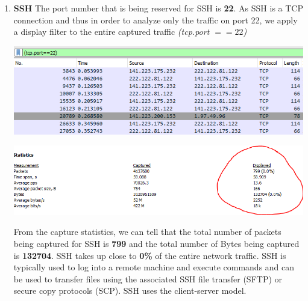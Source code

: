 \documentclass[a4paper,11pt]{article}
\begin{document}
\begin{enumerate}
	\item \textbf{SSH}
	\newline
	The port number that is being reserved for SSH is \textbf{22}. As SSH is a TCP connection and thus in order to analyze only the traffic on port 22, we apply a display filter to the 		entire captured traffic \textit{(tcp.port $== 22$)}\newline
	\begin{minipage}{3in}
	\centering
		\includegraphics[width = 16cm]{sshfilter}
		\captionsetup{justification=centering}
	\end{minipage}
	\newline\newline
	\begin{minipage}{5in}
	\centering
		\includegraphics[width = 16cm]{sshpacketsnbytes}
		\captionsetup{justification=centering}
	\end{minipage}
	\newline\newline
	From the capture statistics, we can tell that the total number of packets being captured for SSH is \textbf{799} and the total number of Bytes being captured is \textbf{132704}. SSH takes up close to \textbf{0\%} of the entire network traffic. SSH is typically used to log into a remote machine and execute commands and can be used to transfer files using the associated SSH file transfer (SFTP) or secure copy protocols (SCP). SSH uses the client-server model.\newline\newline
\begin{minipage}{5in}
	\centering

\end{minipage}
\end{enumerate}
\end{document}
